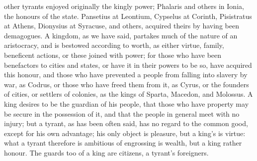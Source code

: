 other tyrants enjoyed originally the kingly power; Phalaris and others in
Ionia, the honours of the state. Pansetius at Leontium, Cypselus at
Corinth, Pisistratus at Athens, Dionysius at Syracuse, and others,
acquired theirs by having been demagogues. A kingdom, as we have said,
partakes much of the nature of an aristocracy, and is bestowed according
to worth, as either virtue, family, beneficent actions, or these joined
with power; for those who have been benefactors to cities and states, or
have it in their powers to be so, have acquired this honour, and those who
have prevented a people from falling into slavery by war, as Codrus, or
those who have freed them from it, as Cyrus, or the founders of cities, or
settlers of colonies, as the kings of Sparta, Macedon, and Molossus. A
king desires to be the guardian of his people, that those who have
property may be secure in the possession of it, and that the people in
general meet with no injury; but a tyrant, as has been often said, has no
regard to the common good, except for his own advantage; his only object
is pleasure, but a king's is virtue: what a tyrant therefore is ambitious
of engrossing is wealth, but a king rather honour. The guards too of a
king are citizens, a tyrant's foreigners.

